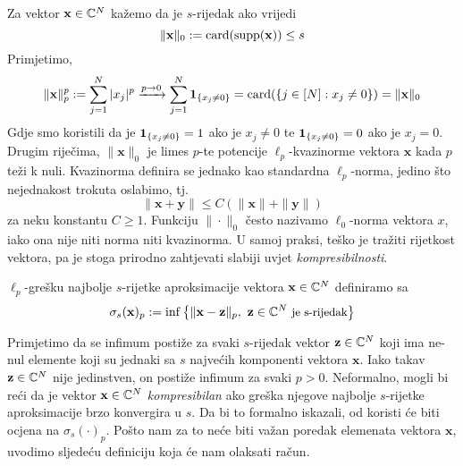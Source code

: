 \documentclass[a4paper,twoside,12pt]{memoir} %
\newcommand{\vect}[1]{\mathbf{#1}}
\newcommand{\card}{\text{\normalfont{card}}}
\newcommand{\supp}{\text{\normalfont{supp}}}
\begin{document}
\noindent Za vektor $\vect{x}\in\C^{N}$ ka\v{z}emo da je $s$-rijedak ako vrijedi $$\|\vect{x}\|_0 := \card(\supp(\vect{x})) \leq s$$
Primjetimo,
$$\|\vect{x}\|_p^p := \sum_{j=1}^N|x_j|^p \xrightarrow{p\rightarrow 0} \sum_{j=1}^N\bold{1}_{\{x_j \neq 0\}} = \card(\{j \in [N]:x_j \neq 0\}) = \|\vect{x}\|_0$$
Gdje smo koristili da je $\bold{1}_{\{x_j \neq 0\}} = 1$  ako je $x_j \neq 0$ te $\bold{1}_{\{x_j \neq 0\}} = 0$  ako je $x_j = 0$. Drugim rije\v{c}ima, $\|\vect{x}\|_0$ je limes $p$-te potencije $\ell_p$-kvazinorme vektora $\vect{x}$ kada $p$ te\v{z}i k nuli. Kvazinorma definira se jednako kao standardna $\ell_p$-norma, jedino \v{s}to nejednakost trokuta oslabimo, tj. 
$$\|\vect{x}+\vect{y}\|\leq C(\|\vect{x}\|+\|\vect{y}\|)$$ 
za neku konstantu $C \geq 1$.
Funkciju $\|\cdot\|_0$ \v{c}esto nazivamo $\ell_0$-norma vektora $x$, iako  ona nije niti norma niti kvazinorma. U samoj praksi, te\v{s}ko je tra\v{z}iti rijetkost vektora, pa je stoga prirodno zahtjevati slabiji uvjet \textit{kompresibilnosti}.  
\begin{defn}
    $\ell_p$-gre\v{s}ku najbolje $s$-rijetke aproksimacije vektora $\vect{x}\in\C^{N}$ definiramo sa 
    $$\sigma_s(\vect{x})_p := \inf\big\{\|\vect{x}-\vect{z}\|_p,\ \vect{z} \in \C^{N} \ \small{\text{je s-rijedak}}\big\}$$
\end{defn}
\indent Primjetimo da se infimum posti\v{z}e za svaki $s$-rijedak vektor $\vect{z} \in \C^{N}$ koji ima ne-nul elemente koji su jednaki sa $s$ najve\'cih komponenti vektora $\vect{x}$. Iako takav $\vect{z} \in \C^{N}$ nije jedinstven, on posti\v{z}e infimum za svaki $p > 0$. Neformalno, mogli bi re\'ci da je vektor $\vect{x} \in \C^{N}$ \textit{kompresibilan} ako gre\v{s}ka njegove najbolje $s$-rijetke aproksimacije brzo konvergira u $s$. Da bi to formalno iskazali, od koristi \'ce biti ocjena na $\sigma_s(\cdot)_p$. Po\v{s}to nam za to ne\'ce biti va\v{z}an poredak elemenata vektora $\vect{x}$, uvodimo sljede\'cu definiciju koja \'ce nam olaksati ra\v{c}un.
\end{document}
